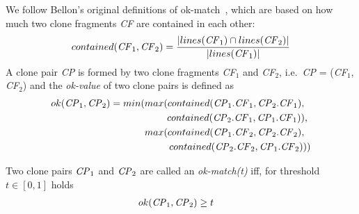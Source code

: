 \documentclass[10pt,journal,compsoc]{IEEEtran}
\newcommand{\squeezeup}{\vspace{-0.5mm}}
\begin{document}
We follow Bellon's original definitions of ok-match~\cite{Bellon2007}, which are based on how much two clone
fragments \textit{CF} are contained in each other:
\begin{displaymath}
contained(\textrm{\textit{CF}}_1, \textrm{\textit{CF}}_2) = \frac{|lines(\textrm{\textit{CF}}_1) \cap lines(\textrm{\textit{CF}}_2)|}{|lines(\textrm{\textit{CF}}_1)|}
\end{displaymath}
\noindent%
A clone pair \textit{CP} is formed by two clone fragments
\textit{CF$_1$} and \textit{CF$_2$}, i.e.~\textit{CP} =
(\textit{CF$_1$}, \textit{CF$_2$})
and the \textit{ok-value} of two clone pairs is defined as
\begin{align*}
ok(\textrm{\textit{CP}}_1,\textrm{\textit{CP}}_2) = min(max(contained(\textrm{\textit{CP}}_1.\textrm{\textit{CF}}_1,\textrm{\textit{CP}}_2.\textrm{\textit{CF}}_1),~~ \\ contained(\textrm{\textit{CP}}_2.\textrm{\textit{CF}}_1,\textrm{\textit{CP}}_1.\textrm{\textit{CF}}_1)),~
\\ max(contained(\textrm{\textit{CP}}_1.\textrm{\textit{CF}}_2,\textrm{\textit{CP}}_2.\textrm{\textit{CF}}_2),~~ \\contained(\textrm{\textit{CP}}_2.\textrm{\textit{CF}}_2,\textrm{\textit{CP}}_1.\textrm{\textit{CF}}_2)))
\end{align*}

\noindent%
Two clone pairs $\textrm{\textit{CP}}_1$ and $\textrm{\textit{CP}}_2$
are called an \textit{ok-match(t)}  iff, for threshold $t \in [0,1]$ holds 
\begin{align*}
ok(\textrm{\textit{CP}}_1,\textrm{\textit{CP}}_2) & \geq t
\end{align*}
\end{document}
